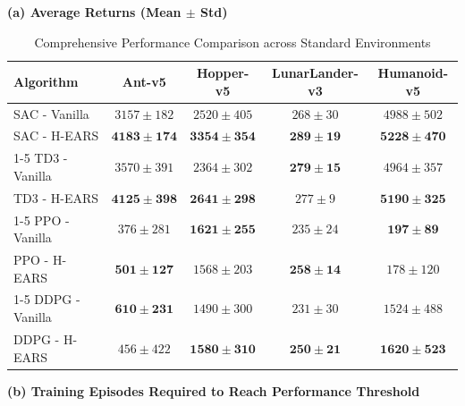 \documentclass[journal]{IEEEtran}
\begin{document}
	\begin{table}[!t]
		\renewcommand{\arraystretch}{1.2}
		\centering
		\captionsetup{font=footnotesize, labelfont=footnotesize}
		\caption{Comprehensive Performance Comparison across Standard Environments}
		\label{tab:comprehensive_results}
		
		\newlength{\subtablewidth}
		\setlength{\subtablewidth}{0.7\textwidth}

		\textbf{(a) Average Returns (Mean $\pm$ Std)}\\[1mm]
		
		\begin{tabular*}{\subtablewidth}{@{\extracolsep{\fill}}lcccc@{}}
			\toprule
			\textbf{Algorithm} & \textbf{Ant-v5} & \textbf{Hopper-v5} & \textbf{LunarLander-v3} & \textbf{Humanoid-v5} \\
			\midrule
			SAC - Vanilla & $3157 \pm 182$ & $2520 \pm 405$ & $268 \pm 30$ & $4988 \pm 502$ \\
			SAC - H-EARS & $\mathbf{4183 \pm 174}$ & $\mathbf{3354 \pm 354}$ & $\mathbf{289 \pm 19}$  & $\mathbf{5228 \pm 470}$ \\
			\cmidrule(lr){1-5}
			TD3 - Vanilla & $3570 \pm 391$ & $2364 \pm 302$ & $\mathbf{279 \pm 15}$ & $4964 \pm 357$ \\
			TD3 - H-EARS & $\mathbf{4125 \pm 398}$ & $\mathbf{2641 \pm 298}$ & $277 \pm 9$ & $\mathbf{5190 \pm 325}$ \\
			\cmidrule(lr){1-5}
			PPO - Vanilla & $376 \pm 281$ & $\mathbf{1621 \pm 255}$ & $235 \pm 24$  & $\mathbf{197 \pm 89}$ \\
			PPO - H-EARS & $\mathbf{501 \pm 127}$ & $1568 \pm 203$ & $\mathbf{258 \pm 14}$ & $178 \pm 120$ \\
			\cmidrule(lr){1-5}
			DDPG - Vanilla & $\mathbf{610 \pm 231}$  & $1490 \pm 300$ & $231 \pm 30$ & $1524 \pm 488$ \\
			DDPG - H-EARS & $456 \pm 422$ & $\mathbf{1580 \pm 310}$ & $\mathbf{250 \pm 21}$ & $\mathbf{1620 \pm 523}$ \\
			\bottomrule
		\end{tabular*}
		
		\vspace{4mm}
		
		\textbf{(b) Training Episodes Required to Reach Performance Threshold}\\[1mm]
		

\end{table}
\end{document}

